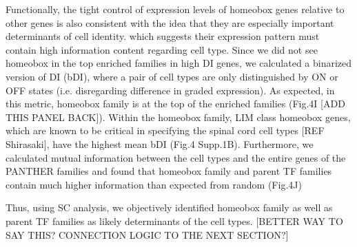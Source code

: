 Functionally, the tight control of expression levels of homeobox genes relative to other genes is also consistent with the idea that they are especially important determinants of cell identity.  which suggests their expression pattern must contain high information content regarding cell type. Since we did not see homeobox in the top enriched families in high DI genes, we calculated a binarized version of DI (bDI), where a pair of cell types are only distinguished by ON or OFF states (i.e. disregarding difference in graded expression). As expected, in this metric, homeobox family is at the top of the enriched families (Fig.4I [ADD THIS PANEL BACK]). Within the homeobox family, LIM class homeobox genes, which are known to be critical in specifying the spinal cord cell types [REF Shirasaki], have the highest mean bDI (Fig.4 Supp.1B). Furthermore, we calculated mutual information between the cell types and the entire genes of the PANTHER families and found that homeobox family and parent TF families contain much higher information than expected from random (Fig.4J)

Thus, using SC analysis, we objectively identified homeobox family as well as parent TF families as likely determinants of the cell types. [BETTER WAY TO SAY THIS? CONNECTION LOGIC TO THE NEXT SECTION?]
